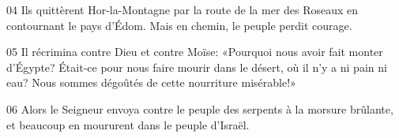 
04 Ils quittèrent Hor-la-Montagne par la route de la mer des Roseaux en contournant le pays d’Édom. Mais en chemin, le peuple perdit courage.

05 Il récrimina contre Dieu et contre Moïse: «Pourquoi nous avoir fait monter d’Égypte? Était-ce pour nous faire mourir dans le désert, où il n’y a ni pain ni eau? Nous sommes dégoûtés de cette nourriture misérable!»

06 Alors le Seigneur envoya contre le peuple des serpents à la morsure brûlante, et beaucoup en moururent dans le peuple d’Israël.
